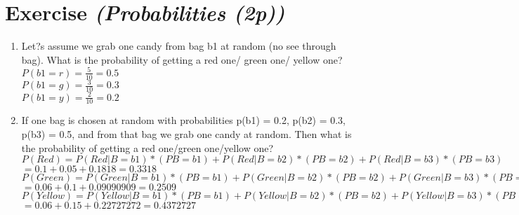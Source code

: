 \documentclass{article}
\author{Sandra Kohl, Jan Hendrik Kirchner, Max Bernhard Ilsen}
\begin{document}
\section{Exercise \textit{(Probabilities (2p))}}
\begin{enumerate}
    \item Let?s assume we grab one candy from bag b1 at random (no see through bag). What is the probability of getting a red one/ green one/ yellow one? \\
    $P(b1 = r) = \frac{5}{10} = 0.5$ \\
    $P(b1 = g) = \frac{3}{10} = 0.3$ \\
    $P(b1 = y) = \frac{2}{10} = 0.2$ \\
   \item If one bag is chosen at random with probabilities p(b1) = 0.2, p(b2) = 0.3, p(b3) = 0.5, and from that bag we grab one candy at random. Then what is the probability of getting a red one/green one/yellow one? \\
    $P(Red) = P(Red | B = b1)*(PB = b1) + P(Red | B = b2)*(PB = b2) + P(Red | B = b3)*(PB = b3)$ \\
    $= 0.1 +  0.05 + 0.1818 = \mathbf{0.3318}$\\
    $P(Green) = P(Green | B = b1)*(PB = b1) + P(Green | B = b2)*(PB = b2) + P(Green | B = b3)*(PB = b3)$ \\
    $= 0.06 +  0.1 + 0.09090909 = \mathbf{0.2509}$\\
    $P(Yellow) = P(Yellow | B = b1)*(PB = b1) + P(Yellow | B = b2)*(PB = b2) + P(Yellow | B = b3)*(PB = b3)$ \\
    $= 0.06 +  0.15 + 0.22727272 = \mathbf{0.4372727}$\\
\end{enumerate}
\end{document}
